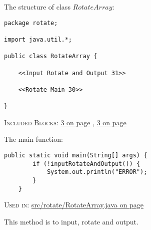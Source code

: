The structure of class $RotateArray$:
\begin{lstlisting}[title={<src/rotate/RotateArray.java 29>}, label=Listing29]
package rotate;

import java.util.*;

public class RotateArray {

    <<Input Rotate and Output 31>>

    <<Rotate Main 30>>

}
\end{lstlisting}\begin{footnotesize} \textsc{Included Blocks}: \hyperref[Listing31]{3 on page} \pageref{Listing31}, \hyperref[Listing30]{3 on page} \pageref{Listing30}\end{footnotesize}\vskip 5mm\noindent
The main function:
\begin{lstlisting}[title={<Rotate Main 30>}, label=Listing30]
    public static void main(String[] args) {
        if (!inputRotateAndOutput()) {
            System.out.println("ERROR");
        }
    }
\end{lstlisting}\begin{footnotesize} \textsc{Used in}: \hyperref[Listing29]{s\-r\-c\-/\-r\-o\-t\-a\-t\-e\-/\-R\-o\-t\-a\-t\-e\-A\-r\-r\-a\-y\-.\-j\-a\-v\-a on page} \pageref{Listing29}  \end{footnotesize}\vskip 5mm\noindent
This method is to input, rotate and output.
